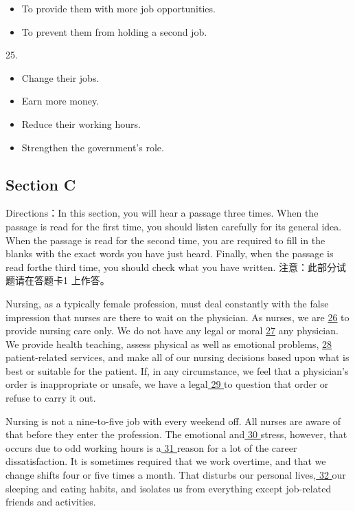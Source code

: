 \documentclass[UTF8,11pt]{ctexart}
\begin{document}
\begin{itemize}[leftmargin=2em,itemsep=.2em,topsep=.4em]\item[B.] To provide them with more job opportunities.
\item[D.] To prevent them from holding a second job.
\end{itemize}

25.


\begin{itemize}[leftmargin=2em,itemsep=.2em,topsep=.4em]\item[A.] Change their jobs.
\item[B.] Earn more money.
\item[C.] Reduce their working hours.
\item[D.] Strengthen the government’s role.
\end{itemize}

\subsection*{Section C}


Directions：In this section, you will hear a passage three times. When the passage is read for the first time, you should listen carefully for its general idea. When the passage is read for the second time, you are required to fill in the blanks with the exact words you have just heard. Finally, when the passage is read forthe third time, you should check what you have written. 注意：此部分试题请在答题卡1 上作答。


Nursing, as a typically female profession, must deal constantly with the false impression that nurses are there to wait on the physician. As nurses, we are \uline{26} to provide nursing care only. We do not have any legal or moral \uline{27} any physician. We provide health teaching, assess physical as well as emotional problems, \uline{28} patient-related services, and make all of our nursing decisions based upon what is best or suitable for the patient. If, in any circumstance, we feel that a physician’s order is inappropriate or unsafe, we have a legal\uline{ 29 }to question that order or refuse to carry it out.


Nursing is not a nine-to-five job with every weekend off. All nurses are aware of that before they enter the profession. The emotional and\uline{ 30 }stress, however, that occurs due to odd working hours is a\uline{ 31 }reason for a lot of the career dissatisfaction. It is sometimes required that we work overtime, and that we change shifts four or five times a month. That disturbs our personal lives,\uline{ 32 }our sleeping and eating habits, and isolates us from everything except job-related friends and activities.
\end{document}
